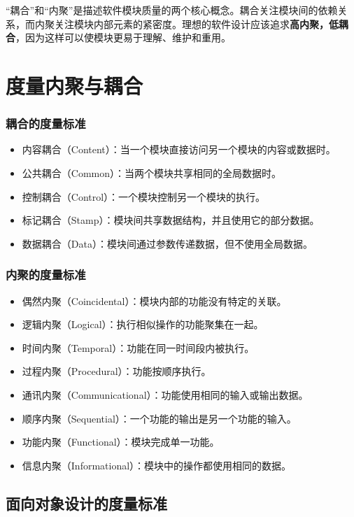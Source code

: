 “耦合”和“内聚”是描述软件模块质量的两个核心概念。耦合关注模块间的依赖关系，而内聚关注模块内部元素的紧密度。理想的软件设计应该追求\textbf{高内聚，低耦合}，因为这样可以使模块更易于理解、维护和重用。

\section{度量内聚与耦合}

\subsubsection{耦合的度量标准}
\begin{itemize}
	\item 内容耦合（Content）：当一个模块直接访问另一个模块的内容或数据时。
    \item 公共耦合（Common）：当两个模块共享相同的全局数据时。
    \item 控制耦合（Control）：一个模块控制另一个模块的执行。
    \item 标记耦合（Stamp）：模块间共享数据结构，并且使用它的部分数据。
    \item 数据耦合（Data）：模块间通过参数传递数据，但不使用全局数据。
\end{itemize}

\subsubsection{内聚的度量标准}

\begin{itemize}
	\item 偶然内聚（Coincidental）：模块内部的功能没有特定的关联。
	\item 逻辑内聚（Logical）：执行相似操作的功能聚集在一起。
	\item 时间内聚（Temporal）：功能在同一时间段内被执行。
	\item 过程内聚（Procedural）：功能按顺序执行。
	\item 通讯内聚（Communicational）：功能使用相同的输入或输出数据。
	\item 顺序内聚（Sequential）：一个功能的输出是另一个功能的输入。
	\item 功能内聚（Functional）：模块完成单一功能。
	\item 信息内聚（Informational）：模块中的操作都使用相同的数据。
\end{itemize}

\subsection{面向对象设计的度量标准}


